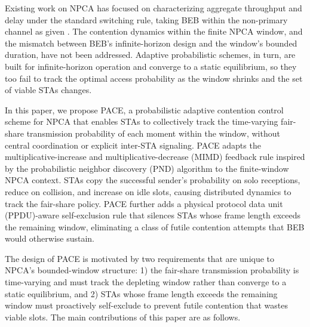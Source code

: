 \documentclass[a4paper,fleqn]{cas-dc}
\begin{document}
Existing work on NPCA has focused on characterizing aggregate throughput and delay under the standard switching rule, taking BEB within the non-primary channel as given \citep{wei2024non,bellalta2025performance,wei2024optimized}. The contention dynamics within the finite NPCA window, and the mismatch between BEB's infinite-horizon design and the window's bounded duration, have not been addressed. Adaptive probabilistic schemes, in turn, are built for infinite-horizon operation and converge to a static equilibrium, so they too fail to track the optimal access probability as the window shrinks and the set of viable STAs changes.

In this paper, we propose PACE, a probabilistic adaptive contention control scheme for NPCA that enables STAs to collectively track the time-varying fair-share transmission probability of each moment within the window, without central coordination or explicit inter-STA signaling. PACE adapts the multiplicative-increase and multiplicative-decrease (MIMD) feedback rule inspired by the probabilistic neighbor discovery (PND) algorithm \citep{song2014pnd} to the finite-window NPCA context. STAs copy the successful sender's probability on solo receptions, reduce on collision, and increase on idle slots, causing distributed dynamics to track the fair-share policy. PACE further adds a physical protocol data unit (PPDU)-aware self-exclusion rule that silences STAs whose frame length exceeds the remaining window, eliminating a class of futile contention attempts that BEB would otherwise sustain.

The design of PACE is motivated by two requirements that are unique to NPCA's bounded-window structure: 1) the fair-share transmission probability is time-varying and must track the depleting window rather than converge to a static equilibrium, and 2) STAs whose frame length exceeds the remaining window must proactively self-exclude to prevent futile contention that wastes viable slots. The main contributions of this paper are as follows.
\end{document}

